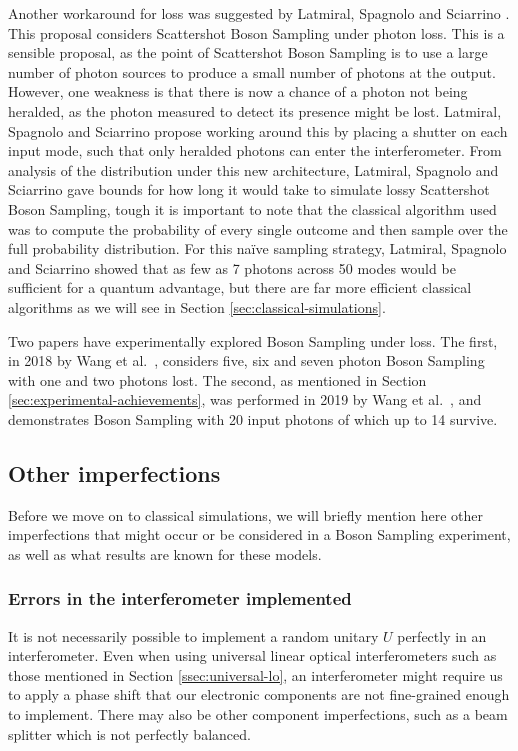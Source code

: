 Another workaround for loss was suggested by Latmiral, Spagnolo and Sciarrino \cite{latmiral2016}. This proposal considers Scattershot Boson Sampling under photon loss. This is a sensible proposal, as the point of Scattershot Boson Sampling is to use a large number of photon sources to produce a small number of photons at the output. However, one weakness is that there is now a chance of a photon not being heralded, as the photon measured to detect its presence might be lost. Latmiral, Spagnolo and Sciarrino propose working around this by placing a shutter on each input mode, such that only heralded photons can enter the interferometer. From analysis of the distribution under this new architecture, Latmiral, Spagnolo and Sciarrino gave bounds for how long it would take to simulate lossy Scattershot Boson Sampling, tough it is important to note that the classical algorithm used was to compute the probability of every single outcome and then sample over the full probability distribution. For this na\"ive sampling strategy, Latmiral, Spagnolo and Sciarrino showed that as few as 7 photons across 50 modes would be sufficient for a quantum advantage, but there are far more efficient classical algorithms as we will see in Section \ref{sec:classical-simulations}.

Two papers have experimentally explored Boson Sampling under loss. The first, in 2018 by Wang et al.~\cite{wang2018}, considers five, six and seven photon Boson Sampling with one and two photons lost. The second, as mentioned in Section \ref{sec:experimental-achievements}, was performed in 2019 by Wang et al.~\cite{wang2019}, and demonstrates Boson Sampling with 20 input photons of which up to 14 survive.

\subsection{Other imperfections}
\label{ssec:other-imperfections}

Before we move on to classical simulations, we will briefly mention here other imperfections that might occur or be considered in a Boson Sampling experiment, as well as what results are known for these models.

\subsubsection{Errors in the interferometer implemented}

It is not necessarily possible to implement a random unitary $U$ perfectly in an interferometer. Even when using universal linear optical interferometers such as those mentioned in Section \ref{ssec:universal-lo}, an interferometer might require us to apply a phase shift that our electronic components are not fine-grained enough to implement. There may also be other component imperfections, such as a beam splitter which is not perfectly balanced.

